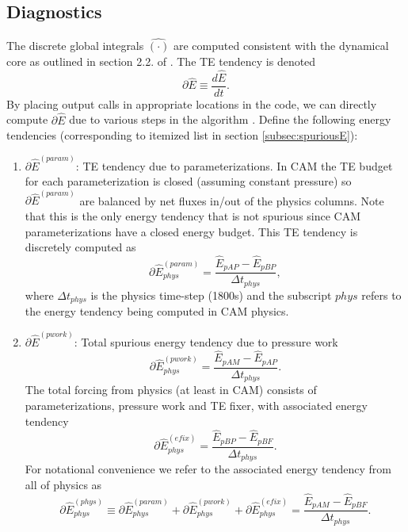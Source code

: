 \documentclass{agujournal}
\newcommand*{\gi}[1]{\widehat{#1}}
\begin{document}
\subsection{Diagnostics}
The discrete global integrals $\gi{(\cdot)}$ are computed consistent with the dynamical core as outlined in section 2.2. of \citet{LBDL2014JAMES}. The TE tendency is denoted
\begin{equation}
\partial \gi{E}\equiv \frac{d\gi{E}}{dt}.
\end{equation}
{}
By placing output calls in appropriate locations in the code, we can directly compute $\partial \gi{E}$ due to various steps in the algorithm {\color{red}{refer section 2.2}}. Define the following energy tendencies (corresponding to itemized list in section \ref{subsec:spuriousE}):
\begin{enumerate}
%
\item $\partial \gi{E}^{(param)}$: TE tendency due to parameterizations. In CAM the TE budget for each parameterization is closed (assuming constant pressure) so $\partial \gi{E}^{(param)}$ are balanced by net fluxes in/out of the physics columns. Note that this is the only energy tendency that is not spurious since CAM parameterizations have a closed energy budget. This TE tendency is discretely computed as
\begin{equation}
\partial \gi{E}_{phys}^{({param})}=\frac{\gi{E}_{pAP}-\gi{E}_{pBP}}{\Delta t_{phys}},
\end{equation}
where $\Delta t_{phys}$ is the physics time-step (1800s) and the subscript $phys$ refers to the energy tendency being computed in CAM physics. 
%
\item $\partial \gi{E}^{({pwork})}$: Total spurious energy tendency due to pressure work
\begin{equation}
\partial \gi{E}_{phys}^{({pwork})}=\frac{\gi{E}_{pAM}-\gi{E}_{pAP}}{\Delta t_{phys}}.
\end{equation}
The total forcing from physics (at least in CAM) consists of parameterizations, pressure work and TE fixer, with associated energy tendency
\begin{equation}
\partial \gi{E}_{phys}^{({efix})}=\frac{\gi{E}_{pBP}-\gi{E}_{pBF}}{\Delta t_{phys}}.
\end{equation}
For notational convenience we refer to the associated energy tendency from all of physics as
\begin{equation}
\partial \gi{E}_{phys}^{({phys})}\equiv \partial \gi{E}_{phys}^{({param})}+\partial \gi{E}_{phys}^{({pwork})}+\partial \gi{E}_{phys}^{({efix})}=\frac{\gi{E}_{pAM}-\gi{E}_{pBF}}{\Delta t_{phys}}.

\end{equation}
\end{enumerate}
\end{document}
